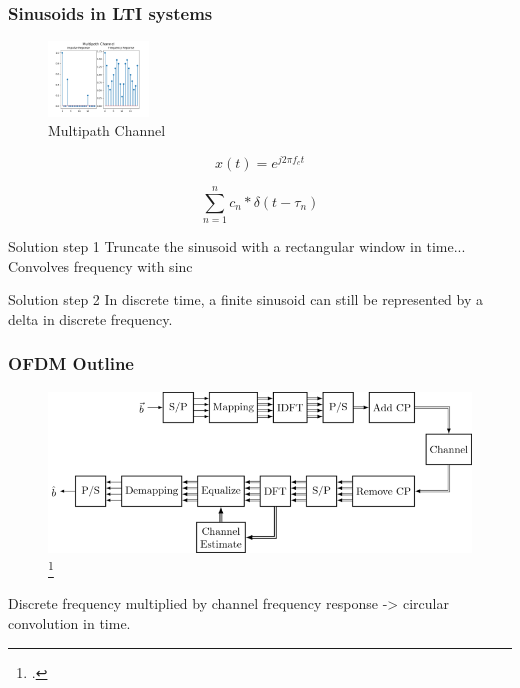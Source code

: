 \documentclass{beamer}
\begin{document}
\begin{frame}[squeeze]
\frametitle{Sinusoids in LTI systems}

	\begin{figure}
			\includegraphics[scale=.4, height=2cm]{Images/Output/Multipath_Channel.png}
		\caption{Multipath Channel}
	\end{figure}

%

			\begin{equation*}
				x(t) = e^{j2\pi f_c t}
			\end{equation*}

			\begin{equation*}
				\sum_{n=1}^{n} c_n*\delta(t-\tau_n)
			\end{equation*}
\end{frame}

\begin{frame}
	\begin{block}{Solution step 1}
		Truncate the sinusoid with a rectangular window in time...
		Convolves frequency with sinc
	\end{block}

	\begin{block}{Solution step 2}
		In discrete time, a finite sinusoid can still be represented by a
		delta in discrete frequency.
	\end{block}

\end{frame}

\begin{frame}[label=OFDM]
	\frametitle{OFDM Outline}
	\begin{figure}
		\includegraphics[scale=.4]{Images/Output/ofdm.png}
		\caption{\footcite{ofdmillustration}}
	\end{figure}
	Discrete frequency  multiplied by channel frequency response -> circular convolution in time.
\end{frame}
\end{document}
